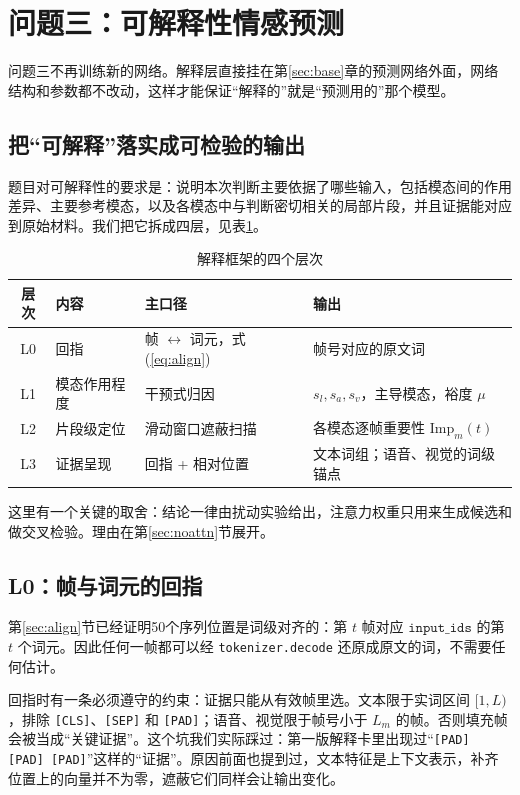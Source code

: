 \section{问题三：可解释性情感预测}\label{sec:q3}

问题三不再训练新的网络。解释层直接挂在第\ref{sec:base}章的预测网络外面，网络结构和参数都不改动，这样才能保证“解释的”就是“预测用的”那个模型。

\subsection{把“可解释”落实成可检验的输出}

题目对可解释性的要求是：说明本次判断主要依据了哪些输入，包括模态间的作用差异、主要参考模态，以及各模态中与判断密切相关的局部片段，并且证据能对应到原始材料。我们把它拆成四层，见表\ref{tab:layers}。

\begin{table}[htbp]
\centering
\caption{解释框架的四个层次}
\label{tab:layers}
\begin{tabular}{clll}
\toprule
层次 & 内容 & 主口径 & 输出 \\
\midrule
L0 & 回指 & 帧 $\leftrightarrow$ 词元，式(\ref{eq:align}) & 帧号对应的原文词 \\
L1 & 模态作用程度 & 干预式归因 & $s_l,s_a,s_v$，主导模态，裕度 $\mu$ \\
L2 & 片段级定位 & 滑动窗口遮蔽扫描 & 各模态逐帧重要性 $\mathrm{Imp}_m(t)$ \\
L3 & 证据呈现 & 回指 + 相对位置 & 文本词组；语音、视觉的词级锚点 \\
\bottomrule
\end{tabular}
\end{table}

这里有一个关键的取舍：结论一律由扰动实验给出，注意力权重只用来生成候选和做交叉检验。理由在第\ref{sec:noattn}节展开。

\subsection{L0：帧与词元的回指}

第\ref{sec:align}节已经证明50个序列位置是词级对齐的：第 $t$ 帧对应 $\texttt{input\_ids}$ 的第 $t$ 个词元。因此任何一帧都可以经 \texttt{tokenizer.decode} 还原成原文的词，不需要任何估计。

回指时有一条必须遵守的约束：证据只能从有效帧里选。文本限于实词区间 $[1,L)$，排除 \texttt{[CLS]}、\texttt{[SEP]} 和 \texttt{[PAD]}；语音、视觉限于帧号小于 $L_m$ 的帧。否则填充帧会被当成“关键证据”。这个坑我们实际踩过：第一版解释卡里出现过“\texttt{[PAD] [PAD] [PAD]}”这样的“证据”。原因前面也提到过，文本特征是上下文表示，补齐位置上的向量并不为零，遮蔽它们同样会让输出变化。

